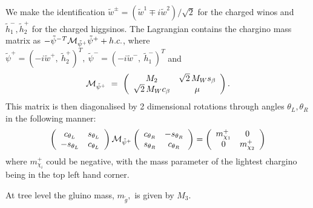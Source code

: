 \documentclass[]{article}
\begin{document}
We make the identification
${\tilde w}^\pm = ({\tilde w^1} \mp i{\tilde w^2} ) / \sqrt{2}$ for the charged
winos and ${\tilde h_1^-}, {\tilde h_2^+}$ for the charged higgsinos.
The Lagrangian contains the chargino mass matrix as
$-{\tilde\psi^-}{}^T{\cal M}_{\tilde\psi^+}\tilde\psi^+ + h.c.$,
where~$\tilde\psi^+ = (-i\tilde w^+,\ \tilde h_2^+)^T,\ \tilde\psi^-=
(-i\tilde w^-,\ \tilde h_1^-)^T$ and
%
\begin{equation}
{\cal M}_{\tilde\psi^+}\ =\ \left( \begin{array}{cc} M_2 &
\sqrt2\,M_Ws_\beta\\\sqrt2\,M_Wc_\beta & \mu\end{array}\right).
\label{mchi}
\end{equation}
%
This matrix is then diagonalised by 2 dimensional rotations through angles
$\theta_L, \theta_R$ in the following manner:
\begin{equation}
\left( \begin{array}{cc} 
c_{\theta_L} & s_{\theta_L} \\
-s_{\theta_L} & c_{\theta_L} \\
\end{array} \right)
{\cal M}_{\tilde\psi^+}
\left( \begin{array}{cc} 
c_{\theta_R} & -s_{\theta_R} \\
s_{\theta_R} & c_{\theta_R} \\
\end{array} \right) =
\left( \begin{array}{cc}
m_{\chi_1}^+ & 0 \\
0 & m_{\chi_2}^+
\end{array}
\right)
\end{equation}
where $m_{\chi_i}^+$ could be negative,
with the mass parameter of the lightest chargino being in the top left hand
corner. 

At tree level the gluino mass, $m_{\tilde g},$ is given by $M_3$.
\end{document}
